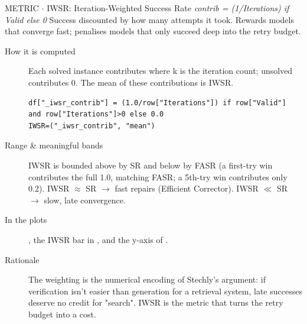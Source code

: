 \begin{bmmcard}{METRIC \(\cdot\) IWSR: Iteration-Weighted Success Rate}
\emph{contrib = (1/Iterations) if Valid else 0}
Success discounted by how many attempts it took. Rewards models that converge fast; penalises models that only succeed deep into the retry budget.
\begin{description}
\item[How it is computed] Each solved instance contributes  where k is the iteration count; unsolved contributes 0. The mean of these contributions is IWSR.

\begin{lstlisting}
df["_iwsr_contrib"] = (1.0/row["Iterations"]) if row["Valid"] and row["Iterations"]>0 else 0.0
IWSR=("_iwsr_contrib", "mean")
\end{lstlisting}
\item[Range \& meaningful bands] IWSR is bounded above by SR and below by FASR (a first-try win contributes the full 1.0, matching FASR; a 5th-try win contributes only 0.2). IWSR \(\approx\) SR \(\rightarrow\) fast repairs (Efficient Corrector). IWSR \(\ll\) SR \(\rightarrow\) slow, late convergence.
\item[In the plots] , the IWSR bar in , and the y-axis of .
\item[Rationale] The  weighting is the numerical encoding of Stechly's argument: if verification isn't easier than generation for a retrieval system, late successes deserve no credit for "search". IWSR is the metric that turns the retry budget into a cost.
\end{description}
\end{bmmcard}

